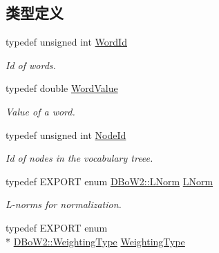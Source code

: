 \subsection*{类型定义}
\begin{DoxyCompactItemize}
\item 
\hypertarget{namespaceDBoW2_ab1a0d3283b2d4690a383372ed20bfeb5}{typedef unsigned int \hyperlink{namespaceDBoW2_ab1a0d3283b2d4690a383372ed20bfeb5}{Word\-Id}}\label{namespaceDBoW2_ab1a0d3283b2d4690a383372ed20bfeb5}

\begin{DoxyCompactList}\small\item\em Id of words. \end{DoxyCompactList}\item 
\hypertarget{namespaceDBoW2_a55fcd7333e591a38e96b91f41bc182f6}{typedef double \hyperlink{namespaceDBoW2_a55fcd7333e591a38e96b91f41bc182f6}{Word\-Value}}\label{namespaceDBoW2_a55fcd7333e591a38e96b91f41bc182f6}

\begin{DoxyCompactList}\small\item\em Value of a word. \end{DoxyCompactList}\item 
\hypertarget{namespaceDBoW2_a3a0fa9c50c0df508759362d6204566f2}{typedef unsigned int \hyperlink{namespaceDBoW2_a3a0fa9c50c0df508759362d6204566f2}{Node\-Id}}\label{namespaceDBoW2_a3a0fa9c50c0df508759362d6204566f2}

\begin{DoxyCompactList}\small\item\em Id of nodes in the vocabulary treee. \end{DoxyCompactList}\item 
\hypertarget{namespaceDBoW2_a350a8bb9e38231cbf68ef07399d7a0c8}{typedef E\-X\-P\-O\-R\-T enum \hyperlink{namespaceDBoW2_a53e9e0bcfc25c861815e413a7cf3fa51}{D\-Bo\-W2\-::\-L\-Norm} \hyperlink{namespaceDBoW2_a350a8bb9e38231cbf68ef07399d7a0c8}{L\-Norm}}\label{namespaceDBoW2_a350a8bb9e38231cbf68ef07399d7a0c8}

\begin{DoxyCompactList}\small\item\em L-\/norms for normalization. \end{DoxyCompactList}\item 
\hypertarget{namespaceDBoW2_a66be5c3cd2567ff15eeaf56fd55fffcc}{typedef E\-X\-P\-O\-R\-T enum \\*
\hyperlink{namespaceDBoW2_a5de5c8a307aca9a84ffefda2a9bc467a}{D\-Bo\-W2\-::\-Weighting\-Type} \hyperlink{namespaceDBoW2_a66be5c3cd2567ff15eeaf56fd55fffcc}{Weighting\-Type}}\label{namespaceDBoW2_a66be5c3cd2567ff15eeaf56fd55fffcc}


\end{DoxyCompactItemize}
